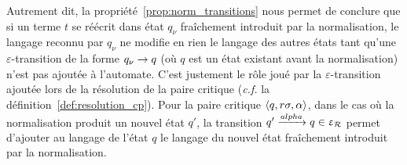 Autrement dit, la propriété~\ref{prop:norm_transitions} nous permet de conclure que si
un terme $t$ se réécrit dans état $q_\nu$ fraîchement introduit par la normalisation, le 
langage reconnu par $q_\nu$ ne modifie en rien le langage des autres états tant qu'une
$\varepsilon$-transition de la forme $q_\nu \rightarrow q$ (où $q$ est un état existant avant la normalisation)
n'est pas ajoutée à l'automate. C'est justement le rôle joué par la $\varepsilon$-transition ajoutée
lors de la résolution de la paire critique (\textit{c.f.} la définition~\ref{def:resolution_cp}).
Pour la paire critique $\langle q, r\sigma, \alpha\rangle$, dans le cas où la normalisation produit un 
nouvel état $q'$, la transition $q' \xrightarrow{alpha} q \in \upvarepsilon_{\mathcal R}$ permet d'ajouter au langage de l'état $q$
le langage du nouvel état fraîchement introduit par la normalisation.







